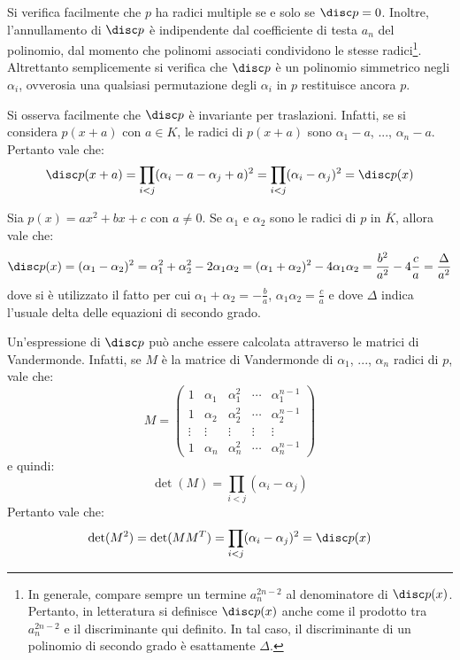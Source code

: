 \documentclass[11pt]{scrartcl}
\begin{document}
	Si verifica facilmente che $p$ ha radici multiple se e solo se $\disc p = 0$. Inoltre,
	l'annullamento di $\disc p$ è indipendente dal coefficiente di testa $a_n$ del polinomio,
	dal momento che polinomi associati condividono le stesse radici\footnote{
		In generale, compare sempre un termine $a_n^{2n-2}$ al denominatore
		di $\disc p(x)$. Pertanto, in letteratura si definisce $\disc p(x)$
		anche come il prodotto tra $a_n^{2n-2}$ e il discriminante qui definito.
		In tal caso, il discriminante di un polinomio di secondo grado è
		esattamente $\Delta$. 
	}. Altrettanto
	semplicemente si verifica che $\disc p$ è un polinomio simmetrico negli $\alpha_i$, ovverosia
	una qualsiasi permutazione degli $\alpha_i$ in $p$ restituisce ancora $p$. \medskip
	
	
	Si osserva facilmente che $\disc p$ è invariante per traslazioni. Infatti,
	se si considera $p(x+a)$ con $a \in K$, le radici di $p(x+a)$ sono $\alpha_1 - a$, ..., $\alpha_n - a$. Pertanto
	vale che:
	\[ \disc p(x+a) = \prod_{i<j} (\alpha_i - a - \alpha_j + a)^2 = \prod_{i<j} (\alpha_i - \alpha_j)^2 = \disc p(x) \]
	
	\begin{example}
		Sia $p(x) = ax^2 + bx + c$ con $a \neq 0$. Se $\alpha_1$ e $\alpha_2$ sono le radici di $p$ in $\overline{K}$, allora vale che:
		\[ \disc p(x) = (\alpha_1 - \alpha_2)^2 = \alpha_1^2 + \alpha_2^2 - 2 \alpha_1 \alpha_2 = (\alpha_1 + \alpha_2)^2 - 4 \alpha_1 \alpha_2 =
		\frac{b^2}{a^2} - 4 \frac{c}{a} = \frac{\Delta}{a^2} \]
		dove si è utilizzato il fatto per cui $\alpha_1 + \alpha_2 = -\frac{b}{a}$, $\alpha_1 \alpha_2 = \frac{c}{a}$
		e dove $\Delta$ indica l'usuale delta delle equazioni di secondo grado.
	\end{example}
	
	\begin{remark}
		Un'espressione di $\disc p$ può anche essere calcolata attraverso le matrici
		di Vandermonde. Infatti, se $M$ è la matrice di Vandermonde di $\alpha_1$, ..., $\alpha_n$
		radici di $p$, vale che:
		\[ M = \begin{pmatrix}1 & \alpha_1 & \alpha_1^2 & \cdots & \alpha_1^{n-1} \\ 1 & \alpha_2 & \alpha_2^2 & \cdots & \alpha_2^{n-1} \\ \vdots & \vdots & \vdots & \vdots & \vdots \\ 1 & \alpha_n & \alpha_n^2 & \cdots & \alpha_n^{n-1}\end{pmatrix} \]
		e quindi:
		\[ \det(M) = \prod_{i < j} (\alpha_i - \alpha_j) \]
		Pertanto vale che:
		\[ \det(M^2) = \det(M M^T) = \prod_{i < j} (\alpha_i - \alpha_j)^2 = \disc p(x) \]
	\end{remark}
	
\end{document}
